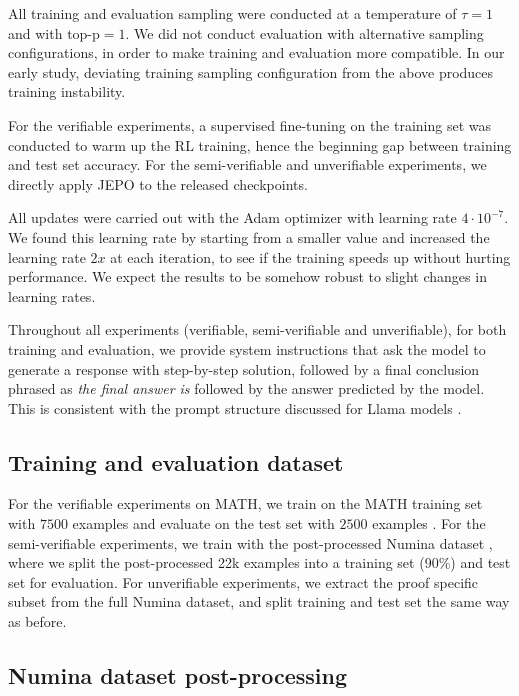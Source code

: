 \documentclass{article}
\theoremstyle{definition}
\begin{document}
\begin{appendix}
All training and evaluation sampling were conducted at a temperature of $\tau=1$ and with $\text{top-p}=1$. We did not conduct evaluation with alternative sampling configurations, in order to make training and evaluation more compatible. In our early study, deviating training sampling configuration from the above produces training instability.

For the verifiable experiments, a supervised fine-tuning on the training set was conducted to warm up the RL training, hence the beginning gap between training and test set accuracy. For the semi-verifiable and unverifiable experiments, we directly apply JEPO to the released checkpoints.

All updates were carried out with the Adam optimizer \citep{kingma2014adam} with learning rate $4\cdot 10^{-7}$. We found this learning rate by starting from a smaller value and increased the learning rate $2x$ at each iteration, to see if the training speeds up without hurting performance. We expect the results to be somehow robust to slight changes in learning rates.

Throughout all experiments (verifiable, semi-verifiable and unverifiable), for both training and evaluation, we provide system instructions that ask the model to generate a response with step-by-step solution, followed by a final conclusion phrased as \emph{the final answer is} followed by the answer predicted by the model. This is consistent with the prompt structure discussed for Llama models \citep{dubey2024llama,yue2024harp}.

\subsection{Training and evaluation dataset}

For the verifiable experiments on MATH, we train on the MATH training set with $7500$ examples and evaluate on the test set with $2500$ examples \citep{hendrycks2021measuring}. For the semi-verifiable experiments, we train with the post-processed Numina dataset \citep{numina_math_datasets}, where we split the post-processed 22k examples into a training set (90\%) and test set for evaluation. For unverifiable experiments, we extract the proof specific subset from the full Numina dataset, and split training and test set the same way as before.

\subsection{Numina dataset post-processing}


\end{appendix}
\end{document}

